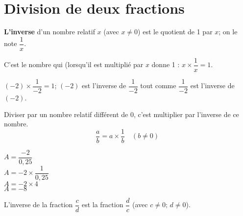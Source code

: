 \section{Division de deux fractions}
\begin{definition}
    \textbf{L'inverse} d'un nombre relatif $x$ (avec $x\not=0$) est le quotient de 1 par $x$; on le note $\dfrac{1}{x}$.
    \par C'est le nombre qui (lorsqu'il est multiplié par $x$ donne 1 : $x\times\dfrac{1}{x}=1$.
\end{definition}

\begin{exemple*1}
    $(-2)\times \dfrac{1}{-2}=1$; $(-2)$ est l'inverse de $\dfrac{1}{-2 }$ tout comme $\dfrac{1}{-2 }$ est l'inverse de $(-2)$.
\end{exemple*1}

\begin{minipage}{0.7\linewidth}
    \begin{propriete}[\admise]
        Diviser par un nombre relatif différent de 0, c'est multiplier par l'inverse de ce nombre.
        $$\frac{a}{b}=a\times\frac{1}{b}\quad(b\not=0)$$
    \end{propriete}
\end{minipage}
\begin{minipage}{0.4\linewidth}
    \begin{exemple*1}
        \phantom{rrr}
        
        \vspace*{5mm}
        $A=\dfrac{-2}{0,25}$\\$A=-2\times\dfrac{1}{0,25}$\\$A=-2\times4$\\$A=-8$
    \end{exemple*1}
\end{minipage}

\begin{remarque}
    L'inverse de la fraction $\dfrac{c}{d}$ est la fraction $\dfrac{d}{c}$ (avec $c\not=0;\,d\not=0$).
\end{remarque}

